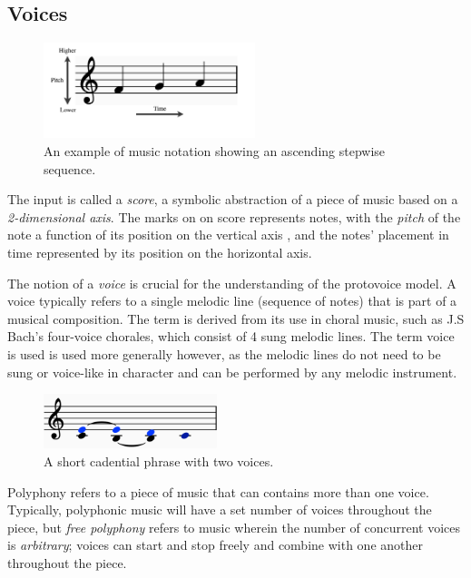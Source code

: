 \documentclass[12pt,a4paper,twoside,openright]{report} \usepackage[pdfborder={0 0 0}]{hyperref}    %
\theoremstyle{definition} \newtheorem{definition}{Definition}[section]
\begin{document}
\subsection{Voices} \begin{figure}[h!] \centering \includegraphics[width=0.55\textwidth]{prep/pitchTime.png}
\captionsetup{width=.7\linewidth} \caption{An example of music notation showing an ascending stepwise sequence.}
\label{fig:pitchTime} \end{figure} The input is called a \textit{score}, a symbolic abstraction of a piece of music
based on a \textit{2-dimensional axis}. The marks on on score represents notes, with the \textit{pitch} of the note
a function of its position on the vertical axis \footnotemark, and the notes' placement in time represented by its
position on the horizontal axis.



The notion of a \textit{voice} is crucial for the understanding of the protovoice model. A voice typically refers to
a single melodic line (sequence of notes) that is part of a musical composition. The term is derived from its use in
choral music, such as J.S Bach's four-voice chorales, which consist of 4 sung melodic lines. The term voice is used is
used more generally however, as the melodic lines do not need to be sung or voice-like in character and can be performed
by any melodic instrument. 

\begin{figure}[h] \centering \includegraphics[width=0.45\textwidth]{prep/cadencevoices}
\captionsetup{width=.9\linewidth} \caption{A short cadential phrase with two voices.} \label{fig:cadenceVoices}
\end{figure}

Polyphony refers to a piece of music that can contains more than one voice. Typically, polyphonic music will have a set
number of voices throughout the piece, but \textit{free polyphony} refers to music wherein the number of concurrent
voices is \textit{arbitrary}; voices can start and stop freely and combine with one another throughout the piece. 
\end{document}
